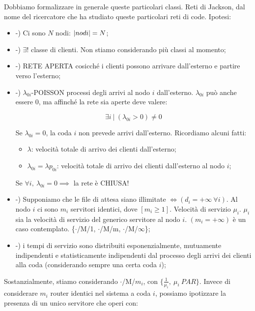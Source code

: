 Dobbiamo formalizzare in generale queste particolari classi. Reti di Jackson, dal nome del ricercatore che ha studiato queste particolari reti di code. Ipotesi:

\begin{itemize}
\item{-)} Ci sono $N$ nodi: $\left\vert{nodi}\right\vert=N$;
\item{-)} $\exists!$ classe di clienti. Non stiamo considerando più classi al momento;
\item{-)} RETE APERTA cosicché i clienti possono arrivare dall'esterno e partire verso l'esterno;
\item{-)} $\lambda_{0i}$-POISSON processi degli arrivi al nodo $i$ dall'esterno. $\lambda_{0i}$ può anche essere 0, ma affinché la rete sia aperte deve valere:

\[
	\exists i\ |\ (\lambda_{0i}>0) \neq 0
\]

Se $\lambda_{0i}=0$, la coda $i$ non prevede arrivi dall'esterno. Ricordiamo alcuni fatti:

\begin{itemize}

\item{$\lambda$}: velocità totale di arrivo dei clienti dall'esterno;
\item{$\lambda_{0i}=\lambda p_{0i}$}: velocità totale di arrivo dei clienti dall'esterno al nodo $i$;
\end{itemize}

Se $\forall i,\ \lambda_{0i}=0 \implies$ la rete è CHIUSA!
\item{-)}  Supponiamo che le file di attesa siano illimitate $\iff (d_i=+\infty\ \forall i)$. Al nodo $i$ ci sono $m_i$ servitori identici, dove $[m_i\geq 1]$. Velocità di servizio $\mu_i$. $\mu_i$ sia la velocità di servizio del generico servitore al nodo $i$. $(m_i=+\infty)$ è un caso contemplato. \{$\mathord{\cdot}$/M/1, $\mathord{\cdot}$/M/m, $\mathord{\cdot}$/M/$\infty$\};
\item{-)} i tempi di servizio sono distribuiti esponenzialmente, mutuamente indipendenti e statisticamente indipendenti dal processo degli arrivi dei clienti alla coda (considerando sempre una certa coda $i$);

\end{itemize}

Sostanzialmente, stiamo considerando $\mathord{\cdot}$/M/$m_i$, con $\{\frac{1}{\mu_i},\ \mu_i\ PAR\}$. Invece di considerare $m_i$ router identici nel sistema a coda $i$, possiamo ipotizzare la presenza di un unico servitore che operi con:

